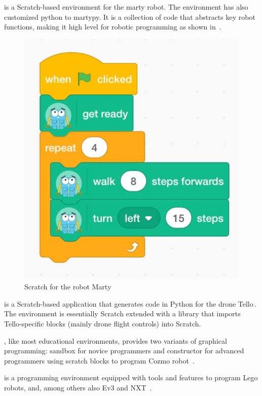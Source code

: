 \parhead{\marty} is a Scratch-based environment for the marty robot. The environment has also customized python to martypy. It is a collection of code that abstracts key robot functions, making it high level for robotic programming as shown in \,\cite{Marty}. 

\begin{figure}[t]
     \centering
    \includegraphics[width=.5\columnwidth]{ScratchMarty.jpg}
      \caption{Scratch for the robot Marty\,\cite{Marty} }
      \label{scratch-marty}
   \end{figure}

\parhead{\tello} is a Scratch-based application that generates code in Python for the drone Tello\,\cite{TelloEduApp}. %
 The environment is essentially Scratch extended with a library that imports Tello-specific blocks (mainly drone flight controls) into Scratch.

\parhead{\codelab}, like most educational environments, provides two variants of graphical programming: sandbox for novice programmers and constructor for advanced programmers using scratch blocks to program Cozmo robot~\cite{COZMO}.

\parhead{\lego} is a programming environment equipped with tools and features to program Lego robots, and, among others also Ev3 and NXT~\cite{LEGO,alternativeLEGO}. %

